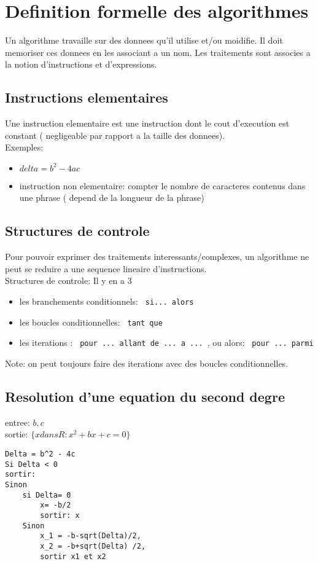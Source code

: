 \documentclass[../main.tex]{subfiles}
\begin{document}
\section{Definition formelle des algorithmes}
Un algorithme travaille sur des donnees qu'il utilise et/ou moidifie.
Il doit memoriser ces donnees en les associant a un nom.
Les traitements sont associes a la notion d'instructions et d'expressions.
\subsection{Instructions elementaires}
Une instruction elementaire est une instruction dont le cout d'execution est constant ( negligeable par rapport a la taille des donnees).\\
Exemples:
\begin{itemize}
\item \texttt{$delta = b^2 - 4ac$} 
\item instruction non elementaire: compter le nombre de caracteres contenus dans une phrase ( depend de la longueur de la phrase)
\end{itemize}

\subsection{Structures de controle}
Pour pouvoir exprimer des traitements interessants/complexes, un algorithme ne peut se reduire a une sequence lineaire d'instructions.\\
Structures de controle: Il y en a 3
\begin{itemize}
\item les branchements conditionnels: \texttt{ si... alors }
\item les boucles conditionnelles: \texttt{ tant que }
\item les iterations : \texttt{ pour ... allant de ... a ... }, ou alors: \texttt{ pour ... parmi }
\end{itemize}
Note: on peut toujours faire des iterations avec des boucles conditionnelles.
\subsection{Resolution d'une equation du second degre}
entree:  $b,c$\\
 sortie:  $\{x dans R: x^2+ bx +c =0\}$
\begin{lstlisting}
Delta = b^2 - 4c
Si Delta < 0
sortir: 
Sinon
	si Delta= 0
		x= -b/2
		sortir: x
	Sinon
		x_1 = -b-sqrt(Delta)/2,
		x_2 = -b+sqrt(Delta) /2,
		sortir x1 et x2
\end{lstlisting}
\end{document}
